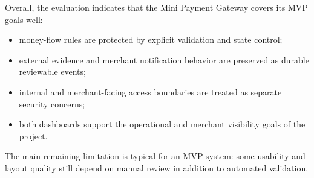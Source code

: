 Overall, the evaluation indicates that the Mini Payment Gateway covers its MVP
goals well:

\begin{itemize}
  \item money-flow rules are protected by explicit validation and state control;
  \item external evidence and merchant notification behavior are preserved as
  durable reviewable events;
  \item internal and merchant-facing access boundaries are treated as separate
  security concerns;
  \item both dashboards support the operational and merchant visibility goals of
  the project.
\end{itemize}

The main remaining limitation is typical for an MVP system: some usability and
layout quality still depend on manual review in addition to automated
validation.
